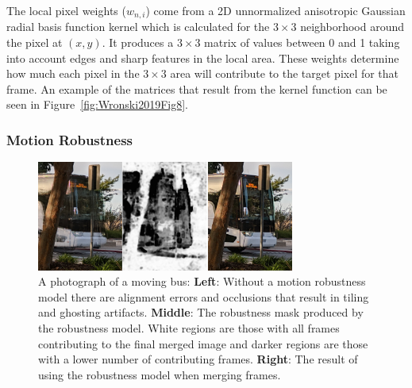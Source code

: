 \documentclass{sig-alternate}
\begin{document}
The local pixel weights ($w_{n, i}$) come from a 2D unnormalized anisotropic Gaussian radial basis function kernel which is calculated for the $3\times 3$ neighborhood around the pixel at $(x,y)$. It produces a $3\times 3$ matrix of values between 0 and 1 taking into account edges and sharp features in the local area. These weights determine how much each pixel in the $3\times 3$ area will contribute to the target pixel for that frame. An example of the matrices that result from the kernel function can be seen in Figure~\ref{fig:Wronski2019Fig8}.



\subsubsection{Motion Robustness}
\label{sec:robustnessModel}

\begin{figure}
\centering
\includegraphics[width=20pc]{figures/wronski2019-figure-9-95quality.jpg}
\caption{A photograph of a moving bus: \textbf{Left}: Without a motion robustness model there are alignment errors and occlusions that result in tiling and ghosting artifacts. \textbf{Middle}: The robustness mask produced by the robustness model. White regions are those with all frames contributing to the final merged image and darker regions are those with a lower number of contributing frames. \textbf{Right}: The result of using the robustness model when merging frames. \cite{Wronski2019}}
\label{fig:Wronski2019Fig9}
\end{figure}
\end{document}
